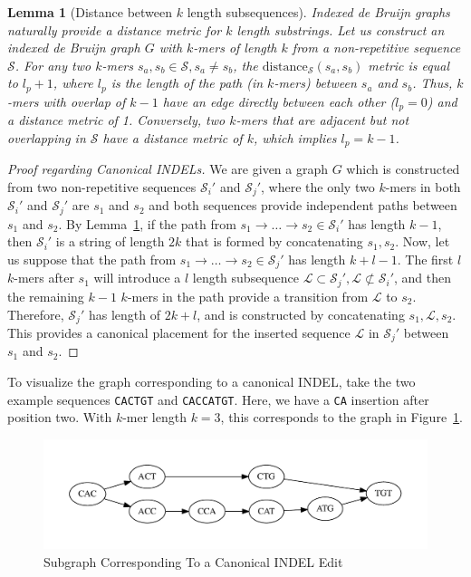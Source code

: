 \documentclass[11pt]{article}
\newtheorem{lemma}{Lemma}
\begin{document}
\begin{lemma}[Distance between $k$ length subsequences]
\label{lem:minimum-distance}
Indexed de Bruijn graphs naturally provide a distance metric for $k$ length substrings. Let us construct an
indexed de Bruijn graph $G$ with $k$-mers of length $k$ from a non-repetitive sequence $\mathcal{S}$.
For any two $k$-mers $s_a, s_b \in \mathcal{S}, s_a \ne s_b$, the
$\text{distance}_\mathcal{S}(s_a, s_b)$ metric is equal to $l_p + 1$, where $l_p$ is the length of the
path (in $k$-mers) between $s_a$ and $s_b$. Thus, $k$-mers with overlap of $k - 1$ have an edge
directly between each other ($l_p = 0$) and a distance metric of 1. Conversely, two $k$-mers that are
adjacent but not overlapping in $\mathcal{S}$ have a distance metric of $k$, which implies $l_p = k - 1$.
\end{lemma}

\begin{proof}[Proof regarding Canonical INDELs]
\label{proof:canonical-indels}
We are given a graph $G$ which is constructed from two non-repetitive sequences $\mathcal{S}_i'$ and
$\mathcal{S}_j'$, where the only two $k$-mers in both $\mathcal{S}_i'$ and $\mathcal{S}_j'$ are $s_1$
and $s_2$ and both sequences provide independent paths between $s_1$ and $s_2$. By
Lemma~\ref{lem:minimum-distance}, if the path from $s_1 \rightarrow \dots \rightarrow s_2 \in
\mathcal{S}_i'$ has length $k - 1$, then $\mathcal{S}_i'$ is a string of length $2k$ that is formed by
concatenating $s_1, s_2$. Now, let us suppose that the path from $s_1 \rightarrow \dots \rightarrow s_2
\in \mathcal{S}_j'$ has length $k + l - 1$. The first $l$ $k$-mers after $s_1$ will introduce a $l$ length
subsequence $\mathcal{L} \subset \mathcal{S}_j', \mathcal{L} \not\subset \mathcal{S}_i'$, and then the
remaining $k - 1$ $k$-mers in the path provide a transition from $\mathcal{L}$ to $s_2$. Therefore,
$\mathcal{S}_j'$ has length of $2k + l$, and is constructed by concatenating $s_1, \mathcal{L}, s_2$.
This provides a canonical placement for the inserted sequence $\mathcal{L}$ in $\mathcal{S}_j'$ between
$s_1$ and $s_2$.
\end{proof}

To visualize the graph corresponding to a canonical INDEL, take the two example sequences
\texttt{CACTGT} and \texttt{CACCATGT}. Here, we have a \texttt{CA} insertion after position two. With
$k$-mer length $k = 3$, this corresponds to the graph in Figure~\ref{fig:indel}.

\begin{figure}[h]
\begin{center}
\includegraphics[width=0.5\linewidth, clip=true, trim=0 39 0 39]{graphs/indel.pdf}
\end{center}
\caption{Subgraph Corresponding To a Canonical INDEL Edit}
\label{fig:indel}
\end{figure}
\end{document}
